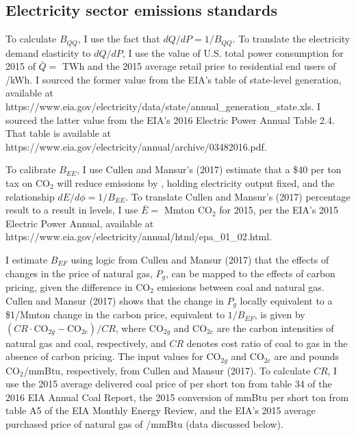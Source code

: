 \documentclass[12pt]{article}
\begin{document}
\subsection{Electricity sector emissions standards} \label{appx:elec}

To calculate $B_{QQ}$, I use the fact that $dQ/dP=1/B_{QQ}$. To translate the electricity demand elasticity to $dQ/dP$, I use the value of U.S. total power consumption for 2015 of $\bar{Q}=$ TWh and the 2015 average retail price to residential end users of \unskip/kWh. I sourced the former value from the EIA's table of state-level generation, available at https://www.eia.gov/electricity/data/state/annual\_generation\_state.xls. I sourced the latter value from the EIA's 2016 Electric Power Annual Table 2.4. That table is available at https://www.eia.gov/electricity/annual/archive/03482016.pdf.

To calibrate $B_{EE}$, I use Cullen and Mansur's (2017) estimate that a \$40 per ton tax on CO$_2$ will reduce emissions by \unskip, holding electricity output fixed, and the relationship $dE/d\phi=1/B_{EE}$. To translate Cullen and Mansur's (2017) percentage result to a result in levels, I use $\bar{E}=$ Mmton CO$_2$ for 2015, per the EIA's 2015 Electric Power Annual, available at https://www.eia.gov/electricity/annual/html/epa\_01\_02.html.

I estimate $B_{EF}$ using logic from Cullen and Mansur (2017) that the effects of changes in the price of natural gas, $P_g$, can be mapped to the effects of carbon pricing, given the difference in CO$_2$ emissions between coal and natural gas. Cullen and Mansur (2017) shows that the change in $P_g$ locally equivalent to a \$1/Mmton change in the carbon price, equivalent to $1/B_{EF}$, is given by $(CR\cdot \text{CO}_{2g} - \text{CO}_{2c}) / CR$, where $\text{CO}_{2g}$ and $\text{CO}_{2c}$ are the carbon intensities of natural gas and coal, respectively, and $CR$ denotes cost ratio of coal to gas in the absence of carbon pricing. The input values for $\text{CO}_{2g}$ and $\text{CO}_{2c}$ are and pounds CO$_2$/mmBtu, respectively, from Cullen and Mansur (2017). To calculate $CR$, I use the 2015 average delivered coal price of per short ton from table 34 of the 2016 EIA Annual Coal Report, the 2015 conversion of  mmBtu per short ton from table A5 of the EIA Monthly Energy Review, and the EIA's 2015 average purchased price of natural gas of  \unskip/mmBtu (data discussed below).
\end{document}
